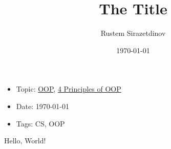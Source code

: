 \documentclass[a4paper,12pt]{report}
\title{The \huge{Title}}
\author{Rustem Sirazetdinov}
\date{\today}
\begin{document}

    \begin{itemize}[noitemsep,nolistsep]
        \item Topic: \href{https://en.wikipedia.org/wiki/Object-oriented_programming}{OOP},
            \href{https://khalilstemmler.com/articles/object-oriented/programming/4-principles/}
            {4 Principles of OOP}
        \item Date: \today
        \item Tags: CS, OOP
    \end{itemize}


Hello, World!
\end{document}
